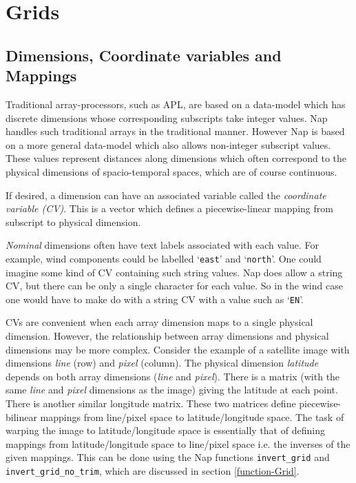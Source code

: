 
\section{Grids}
    \label{grid}

\subsection{Dimensions, Coordinate variables and Mappings}
    \label{grid-Dims}

Traditional array-processors, such as APL, are based on a
  data-model which has discrete dimensions whose corresponding
  subscripts take integer values. Nap handles such traditional arrays
  in the traditional manner. However Nap is based on a more general
  data-model which also allows non-integer subscript values. These
  values represent distances along dimensions which often correspond to
  the physical dimensions of spacio-temporal spaces, which are of
  course continuous.

If desired, a dimension can have an associated variable called the
  \textit{coordinate variable (CV)}. This is a vector which defines a
  piecewise-linear mapping from subscript to physical dimension.

\emph{Nominal} dimensions often have text labels associated with each value.
For example, wind components could be labelled `\texttt{east}' and `\texttt{north}'.
One could imagine some kind of CV containing such string values.
Nap does allow a string CV, but there can be only a single character for each value.
So in the wind case one would have to make do with a string CV with a value such as `\texttt{EN}'.

CVs are convenient when each array dimension maps to a single
  physical dimension. However, the relationship between array
  dimensions and physical dimensions may be more complex. Consider the
  example of a satellite image with dimensions 
  \textit{line} (row) and 
  \textit{pixel} (column). The physical dimension 
  \textit{latitude} depends on both array dimensions (\textit{line} and 
  \textit{pixel}). There is a matrix (with the same 
  \textit{line} and 
  \textit{pixel} dimensions as the image) giving the latitude at each
  point. There is another similar longitude matrix. These two matrices
  define piecewise-bilinear mappings from line/pixel space to
  latitude/longitude space. The task of warping the image to
  latitude/longitude space is essentially that of defining mappings
  from latitude/longitude space to line/pixel space i.e. the inverses
  of the given mappings. This can be done using the Nap functions 
{\texttt{invert\_grid} and \texttt{invert\_grid\_no\_trim}},
which are discussed in section \ref{function-Grid}.

